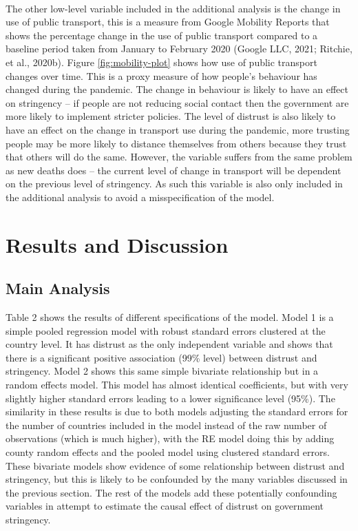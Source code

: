 \documentclass[
  11pt,
]{article}
\begin{document}
~\\
The other low-level variable included in the additional analysis is the change in use of public transport, this is a measure from Google Mobility Reports that shows the percentage change in the use of public transport compared to a baseline period taken from January to February 2020 (Google LLC, 2021; Ritchie, et al., 2020b). Figure \ref{fig:mobility-plot} shows how use of public transport changes over time. This is a proxy measure of how people's behaviour has changed during the pandemic. The change in behaviour is likely to have an effect on stringency -- if people are not reducing social contact then the government are more likely to implement stricter policies. The level of distrust is also likely to have an effect on the change in transport use during the pandemic, more trusting people may be more likely to distance themselves from others because they trust that others will do the same. However, the variable suffers from the same problem as new deaths does -- the current level of change in transport will be dependent on the previous level of stringency. As such this variable is also only included in the additional analysis to avoid a misspecification of the model.\\

\hypertarget{results-and-discussion}{%
\section{Results and Discussion}\label{results-and-discussion}}

\hypertarget{main-analysis}{%
\subsection{Main Analysis}\label{main-analysis}}

Table 2 shows the results of different specifications of the model. Model 1 is a simple pooled regression model with robust standard errors clustered at the country level. It has distrust as the only independent variable and shows that there is a significant positive association (99\% level) between distrust and stringency. Model 2 shows this same simple bivariate relationship but in a random effects model. This model has almost identical coefficients, but with very slightly higher standard errors leading to a lower significance level (95\%). The similarity in these results is due to both models adjusting the standard errors for the number of countries included in the model instead of the raw number of observations (which is much higher), with the RE model doing this by adding county random effects and the pooled model using clustered standard errors. These bivariate models show evidence of some relationship between distrust and stringency, but this is likely to be confounded by the many variables discussed in the previous section. The rest of the models add these potentially confounding variables in attempt to estimate the causal effect of distrust on government stringency.\\
~\\
\end{document}
